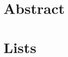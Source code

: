\newcommand{\introduce}[1]{\emph{#1}\index{#1}} %
\newcommand{\reuse}[1]{\emph{#1}\index{#1}} %

\newcommand{\lastAccessed}{(last accessed: Jan.\ 23rd, 2011)} %

\newcommand{\lO}{\mathcal{O}} %

\newcommand{\curie}[1]{\url{#1}} 
\newcommand{\iri}[1]{<\url{#1}>}
\newcommand{\iripart}[1]{\url{#1}}



\frontmatter %



\begingroup
	\chapter{Abstract}
	
\endgroup

\setcounter{tocdepth}{1} %
\tableofcontents

\chapter{Lists}
\begingroup
	\renewcommand*{\chapter}{\section}
	\renewcommand*{\addchap}{\addsec}
	\renewcommand*{\listfigurename}{Figures}
	\listoffigures
	\renewcommand*{\listtablename}{Tables}
	\listoftables
	\renewcommand{\lstlistlistingname}{Listings}
	\lstlistoflistings
\endgroup

